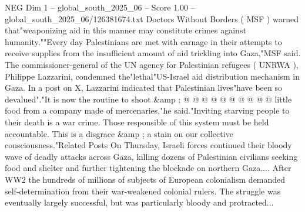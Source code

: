 \begin{textsample}{NEG Dim 1 – global\_south\_2025\_06 – Score 1.00 – global\_south\_2025\_06/126381674.txt}
Doctors Without Borders ( MSF ) warned that"weaponizing aid in this manner may constitute crimes against humanity.""Every day Palestinians are met with carnage in their attempts to receive supplies from the insufficient amount of aid trickling into Gaza,"MSF said.
The commissioner-general of the UN agency for Palestinian refugees ( UNRWA ), Philippe Lazzarini, condemned the"lethal"US-Israel aid distribution mechanism in Gaza.
In a post on X, Lazzarini indicated that Palestinian lives"have been so devalued"."It is now the routine to shoot \&amp ; @ @ @ @ @ @ @ @ @ @ little food from a company made of mercenaries,"he said."Inviting starving people to their death is a war crime.
Those responsible of this system must be held accountable.
This is a disgrace \&amp ; a stain on our collective consciousness."Related Posts On Thursday, Israeli forces continued their bloody wave of deadly attacks across Gaza, killing dozens of Palestinian civilians seeking food and shelter and further tightening the blockade on northern Gaza....
After WW2 the hundreds of millions of subjects of European colonialism demanded self-determination from their war-weakened colonial rulers.
The struggle was eventually largely successful, but was particularly bloody and protracted...

\end{textsample}
